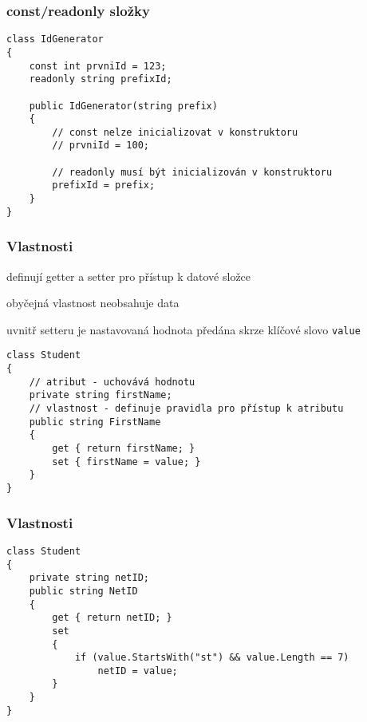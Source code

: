 \begin{frame}[fragile]
\frametitle{const/readonly složky}
\vfill
\begin{yesblock}
\begin{lstlisting}
class IdGenerator
{
    const int prvniId = 123;
    readonly string prefixId;

    public IdGenerator(string prefix)
    {
        // const nelze inicializovat v konstruktoru
        // prvniId = 100;

        // readonly musí být inicializován v konstruktoru
        prefixId = prefix;
    }
}
\end{lstlisting}
\end{yesblock}
\vfill
\end{frame}





\begin{frame}[fragile]
\frametitle{Vlastnosti}
\vfill
\begin{bitemize}{}
\item definují getter a setter pro přístup k datové složce
\item obyčejná vlastnost neobsahuje data
\item uvnitř setteru je nastavovaná hodnota předána skrze klíčové slovo \lstinline|value|
\end{bitemize}
\vfill
\begin{yesblock}
\begin{lstlisting}
class Student
{
    // atribut - uchovává hodnotu
    private string firstName; 
    // vlastnost - definuje pravidla pro přístup k atributu
    public string FirstName 
    {
        get { return firstName; }
        set { firstName = value; }
    }
}
\end{lstlisting}
\end{yesblock}
\vfill
\end{frame}



\begin{frame}[fragile]
\frametitle{Vlastnosti}
\begin{yesblock}
\begin{lstlisting}
class Student
{
    private string netID;
    public string NetID
    {
        get { return netID; }
        set
        {
            if (value.StartsWith("st") && value.Length == 7)
                netID = value;
        }
    }
}
\end{lstlisting}
\end{yesblock}
\end{frame}


